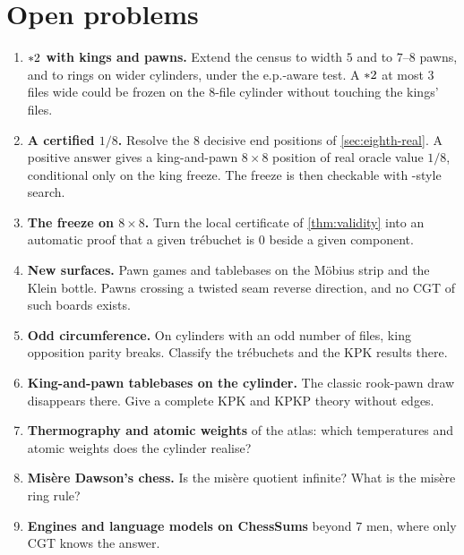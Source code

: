 \section{Open problems}\label{sec:open}

\begin{enumerate}[leftmargin=*]
\item \textbf{$\mathord{\ast 2}$ with kings and pawns.} Extend the census to width $5$ and to $7$--$8$ pawns, and to
  rings on wider cylinders, under the e.p.-aware test. A $\mathord{\ast 2}$ at most $3$ files wide could be frozen on the
  $8$-file cylinder without touching the kings' files.
\item \textbf{A certified $1/8$.} Resolve the $8$ decisive end positions of \cref{sec:eighth-real}. A positive
  answer gives a king-and-pawn $8\times8$ position of real oracle value $1/8$, conditional only on the king
  freeze. The freeze is then checkable with -style search.
\item \textbf{The freeze on $8\times8$.} Turn the local certificate of \cref{thm:validity} into an automatic
  proof that a given tr\'ebuchet is $0$ beside a given component.
\item \textbf{New surfaces.} Pawn games and tablebases on the M\"obius strip and the Klein bottle. Pawns
  crossing a twisted seam reverse direction, and no CGT of such boards exists.
\item \textbf{Odd circumference.} On cylinders with an odd number of files, king opposition parity breaks.
  Classify the tr\'ebuchets and the KPK results there.
\item \textbf{King-and-pawn tablebases on the cylinder.} The classic rook-pawn draw disappears there. Give a
  complete KPK and KPKP theory without edges.
\item \textbf{Thermography and atomic weights} of the atlas: which temperatures and atomic weights does the
  cylinder realise?
\item \textbf{Misère Dawson's chess.} Is the misère quotient infinite? What is the misère ring rule?
\item \textbf{Engines and language models on ChessSums} beyond $7$ men, where only CGT knows the answer.
\end{enumerate}
